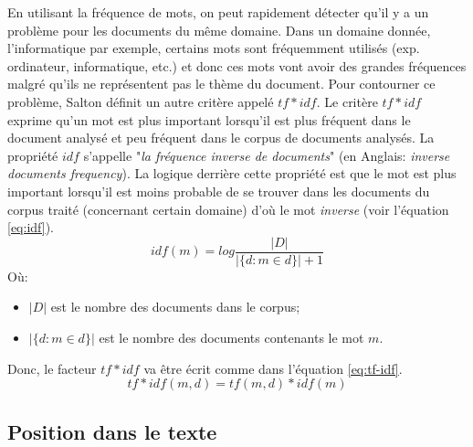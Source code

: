 \documentclass[a4paper,12pt,oneside]{../use/ESIthesis}
\begin{document}
En utilisant la fréquence de mots, on peut rapidement détecter qu'il y a un problème pour les documents du même domaine. 
Dans un domaine donnée, l'informatique par exemple, certains mots sont fréquemment utilisés (exp. ordinateur, informatique, etc.) et donc ces mots vont avoir des grandes fréquences malgré qu'ils ne représentent pas le thème du document. 
Pour contourner ce problème, Salton \cite{73-salton-yang} définit un autre critère appelé $ tf*idf $. 
Le critère $ tf*idf $ exprime qu'un mot est plus important lorsqu'il est plus fréquent dans le document analysé et peu fréquent dans le corpus de documents analysés. 
La propriété $ idf $ s'appelle "\textit{la fréquence inverse de documents}" (en Anglais: \textit{inverse documents frequency}). 
La logique derrière cette propriété est que le mot est plus important lorsqu'il est moins probable de se trouver dans les documents du corpus traité (concernant certain domaine) d'où le mot \textit{inverse} (voir l'équation \ref{eq:idf}).
%
\begin{equation}
\label{eq:idf}
idf(m) = log{\frac{|D|}{|\{d: m \in d\}|+1}}
\end{equation}
Où: 
\begin{itemize}
\item $ |D| $ est le nombre des documents dans le corpus;
\item $ |\{d: m \in d\}| $ est le nombre des documents contenants le mot $ m $.
\end{itemize}
Donc, le facteur $ tf*idf $ va être écrit comme dans l'équation \ref{eq:tf-idf}.
\begin{equation}
\label{eq:tf-idf}
tf*idf(m, d) = tf(m, d)*idf(m)
\end{equation}

\subsection{Position dans le texte}
\end{document}
